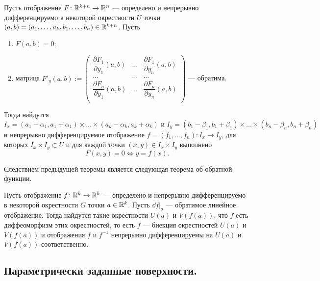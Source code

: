 \documentclass[a4paper]{article}
\theoremstyle{named}
\begin{document}
    \begin{theorem*}
        Пусть отображение $F\colon \mathbb{R}^{k+n}\to \mathbb{R}^n$ --- определено и непрерывно дифференцируемо в некоторой окрестности $U$ точки $(a,b)=(a_1,\ldots, a_k,b_1,\ldots, b_n)\in \mathbb{R}^{k+n}$.
        Пусть
        \begin{enumerate}
        \item
            $F(a, b) = 0$;
    
        \item
            матрица
            $F'_y(a,b):=
            \begin{pmatrix}
                \dfrac{\partial F_1}{\partial y_1}(a,b) & \ldots & \dfrac{\partial F_1}{\partial y_n}(a,b) \\
                \ldots & \ldots & \ldots \\
                \dfrac{\partial F_n}{\partial y_1}(a,b) & \ldots & \dfrac{\partial F_n}{\partial y_n}(a,b) \\
            \end{pmatrix}$
            --- обратима.
        \end{enumerate}
    
        Тогда найдутся
        $$
            I_x = (a_1-\alpha_1, a_1+\alpha_1)\times\ldots\times (a_k-\alpha_k, a_k+\alpha_k) 
            \text{ и }
            I_y=(b_1-\beta_1, b_1+\beta_1)\times\ldots\times(b_n-\beta_n, b_n+\beta_n)
        $$
        и непрерывно дифференцируемое отображение $f=(f_1,\ldots, f_n)\colon I_x\to I_y$, для которых $I_x\times I_y\subset U$ и для каждой точки $(x,y)\in I_x\times I_y$ выполнено 
        $$F(x,y)=0 \Leftrightarrow y=f(x).$$
    \end{theorem*}

    Следствием предыдущей теоремы является следующая теорема об обратной функции.

    \begin{theorem*}
        Пусть отображение $f\colon \mathbb{R}^{k}\to \mathbb{R}^k$ --- определено и непрерывно дифференцируемо в некоторой окрестности $G$ точки $a\in \mathbb{R}^k$.
        Пусть $\dd f\bigl|_{a}$ --- обратимое линейное отображение.
        Тогда найдутся такие окрестности $U(a)$ и $V(f(a))$, что $f$ есть диффеоморфизм этих окрестностей, то есть $f$ --- биекция окрестностей $U(a)$ и $V(f(a))$ и отображения $f$ и $f^{-1}$ непрерывно дифференцируемы на $U(a)$ и $V(f(a))$ соответственно.
    \end{theorem*}

    \subsection{Параметрически заданные поверхности.}
\end{document}
